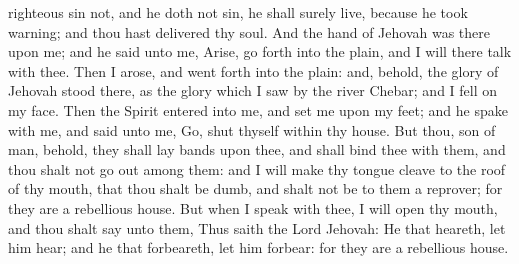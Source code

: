 righteous sin not, and he doth not sin, he shall surely live, because he took warning; and thou hast delivered thy soul.  And the hand of Jehovah was there upon me; and he said unto me, Arise, go forth into the plain, and I will there talk with thee. Then I arose, and went forth into the plain: and, behold, the glory of Jehovah stood there, as the glory which I saw by the river Chebar; and I fell on my face. Then the Spirit entered into me, and set me upon my feet; and he spake with me, and said unto me, Go, shut thyself within thy house. But thou, son of man, behold, they shall lay bands upon thee, and shall bind thee with them, and thou shalt not go out among them: and I will make thy tongue cleave to the roof of thy mouth, that thou shalt be dumb, and shalt not be to them a reprover; for they are a rebellious house. But when I speak with thee, I will open thy mouth, and thou shalt say unto them, Thus saith the Lord Jehovah: He that heareth, let him hear; and he that forbeareth, let him forbear: for they are a rebellious house. 

